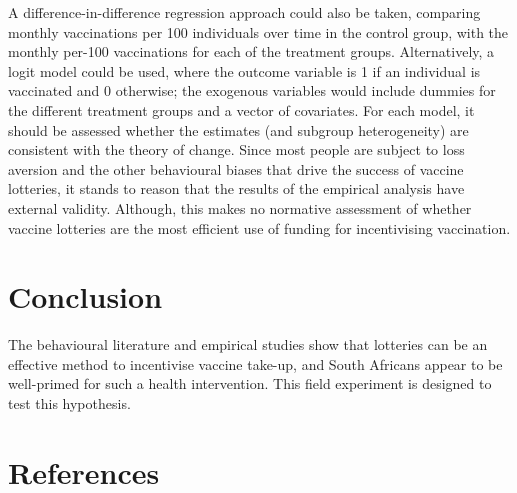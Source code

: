 \documentclass[11pt,preprint, authoryear]{elsarticle}
\numberwithin{equation}{section}
\numberwithin{figure}{section}
\numberwithin{table}{section}
\begin{document}
A difference-in-difference regression approach could also be taken,
comparing monthly vaccinations per 100 individuals over time in the
control group, with the monthly per-100 vaccinations for each of the
treatment groups. Alternatively, a logit model could be used, where the
outcome variable is 1 if an individual is vaccinated and 0 otherwise;
the exogenous variables would include dummies for the different
treatment groups and a vector of covariates. For each model, it should
be assessed whether the estimates (and subgroup heterogeneity) are
consistent with the theory of change. Since most people are subject to
loss aversion and the other behavioural biases that drive the success of
vaccine lotteries, it stands to reason that the results of the empirical
analysis have external validity. Although, this makes no normative
assessment of whether vaccine lotteries are the most efficient use of
funding for incentivising vaccination.

\hypertarget{conclusion}{%
\section{\texorpdfstring{Conclusion
\label{con}}{Conclusion }}\label{conclusion}}

The behavioural literature and empirical studies show that lotteries can
be an effective method to incentivise vaccine take-up, and South
Africans appear to be well-primed for such a health intervention. This
field experiment is designed to test this hypothesis.

\newpage

\hypertarget{references}{%
\section*{References}\label{references}}
\end{document}
